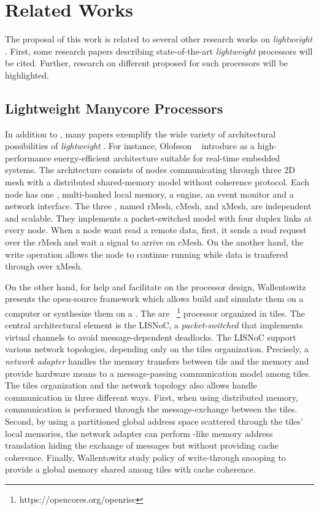 \chapter{Related Works}
\label{ch.related-works}

The proposal of this work is related to several other research works
on \textit{lightweight} \manycores.
First, some research papers describing state-of-the-art \textit{lightweight} \manycores
processors will be cited. Further, research on different \oses
proposed for such processors will be highlighted.

\section{Lightweight Manycore Processors}
\label{sec.works.manycores}

	In addition to \mppa, many papers exemplify the wide variety of architectural
	possibilities of \textit{lightweight} \manycores.
	For instance, Olofsson \etal~\cite{olofsson2014} introduce \epiphany as a
	high-performance energy-efficient \manycore architecture suitable for
	real-time embedded systems.
	The architecture consists of nodes communicating through three 2D mesh \nocs
	with a distributed shared-memory model without coherence protocol.
	Each node has one \risc \cpu, multi-banked local memory, a \dma engine,
	an event monitor and a network interface.
	The three \nocs, named rMesh, cMesh, and xMesh, are independent and scalable.
	They implements a packet-switched model with four duplex links at every node.
	When a node want read a remote data, first, it sends a read request over the rMesh
	and wait a signal to arrive on cMesh.
	On the another hand, the write operation allows the node to continue running
	while data is tranfered through over xMesh.

	On the other hand, for help and facilitate on the \manycore processor design,
	Wallentowitz \etal~\cite{Wallentowitz2013} presents the open-source framework
	\optimsoc which allows build \manycore \soc and simulate them on a computer or
	synthesize them on a \fpga.
	The \pe are \openrisc~\footnote{https://opencores.org/openrisc}
	processor organized in tiles.
	The central architectural element is the LISNoC, a \textit{packet-switched \noc}
	that implements virtual channels to avoid message-dependent deadlocks.
	The LISNoC support various network topologies, depending only on the tiles organization.
	Precisely, a \textit{network adapter} handles the memory transfers between
	tile and the memory and provide hardware means to a message-passing communication
	model among tiles.
	The tiles organization and the network topology also allows handle communication
	in three different ways.
	First, when using distributed memory, communication is performed through the
	message-exchange between the tiles.
	Second, by using a partitioned global address space scattered through the
	tiles' local memories, the network adapter can perform \mpu-like memory
	address translation hiding the exchange of messages but without providing cache coherence.
	Finally, Wallentowitz \etal study policy of write-through snooping to provide
	a global memory shared among tiles with cache coherence.

